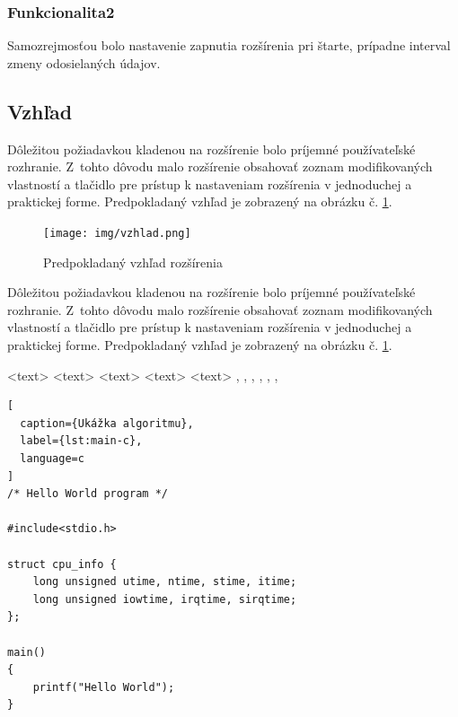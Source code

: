 \subsubsection{Funkcionalita2}
\noindent Samozrejmosťou bolo nastavenie zapnutia rozšírenia pri štarte, prípadne interval zmeny odosielaných údajov.

\subsection{Vzhľad}
\noindent Dôležitou požiadavkou kladenou na rozšírenie bolo príjemné používateľské rozhranie. Z~tohto dôvodu malo rozšírenie obsahovať zoznam modifikovaných vlastností a tlačidlo pre prístup k nastaveniam rozšírenia v jednoduchej a praktickej forme. Predpokladaný vzhľad je zobrazený na obrázku č. \ref{vzhladobr}.
\begin{figure}[!htbp]
  \centering
  \texttt{[image: img/vzhlad.png]}
  \caption{Predpokladaný vzhľad rozšírenia}
  \label{vzhladobr}
\end{figure}
\noindent Dôležitou požiadavkou kladenou na rozšírenie bolo príjemné používateľské rozhranie.\cite{t00} Z~tohto dôvodu malo rozšírenie obsahovať zoznam modifikovaných vlastností a tlačidlo pre prístup k nastaveniam rozšírenia v jednoduchej a praktickej forme. Predpokladaný vzhľad je zobrazený na obrázku č. \ref{vzhladobr}.

\begin{algorithm}
\scriptsize
\begin{algorithmic}
 \STATE <text>
   \ELSE {} \ENDIF
     \ENDIF
   \ENDFOR
   \ENDFOR
   \ENDFOR
   \ENDWHILE
 \REPEAT {} 
 \LOOP {} \ENDLOOP
 \REQUIRE <text>
 \ENSURE <text>
 \RETURN <text>
 \PRINT <text>
 \AND, \OR, \XOR, \NOT, \TO, \TRUE, \FALSE
\end{algorithmic}
\caption{Ukážka príkazov pre algorithmic}
\label{alg:preview}
\end{algorithm}

\begin{lstlisting}[
  caption={Ukážka algoritmu},
  label={lst:main-c},
  language=c
]
/* Hello World program */

#include<stdio.h>

struct cpu_info {
    long unsigned utime, ntime, stime, itime;
    long unsigned iowtime, irqtime, sirqtime;
};

main()
{
    printf("Hello World");
}
\end{lstlisting}
